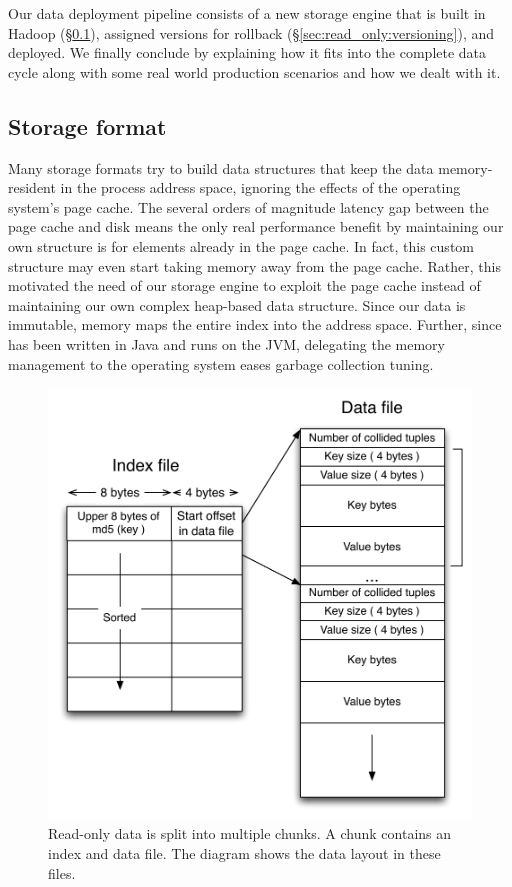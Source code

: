 Our data deployment pipeline consists of a new storage engine that
is built in Hadoop (\S\ref{sec:read_only:storage_format}), assigned versions
for rollback (\S\ref{sec:read_only:versioning}), and deployed. We
finally conclude by explaining how it fits into the complete data 
cycle along with some real world production scenarios and
how we dealt with it. 


\subsection{Storage format}
\label{sec:read_only:storage_format}

Many storage formats try to build data structures that keep the data
memory-resident in the process address space, ignoring the effects of
the operating system's page cache. The several orders of magnitude 
latency gap between the page cache and disk means the only real 
performance benefit by maintaining our own structure is for elements 
already in the page cache. In fact, this custom structure may even 
start taking memory away from the page cache. Rather, this motivated 
the need of our storage engine to exploit the page cache instead of 
maintaining our own complex heap-based data structure. Since our data is immutable, 
\projectname{} memory maps the entire index into the address space. 
Further, since \projectname{} has been written in Java and runs on 
the JVM, delegating the memory management to the operating system 
eases garbage collection tuning.

\begin{figure}
  \centering
    \includegraphics[scale=0.45]{images/storage_format.pdf}
  \caption{Read-only data is split into multiple chunks. A chunk contains an index and data file. The diagram shows the data layout in these files.}
  \label{storage_format}
\end{figure}

